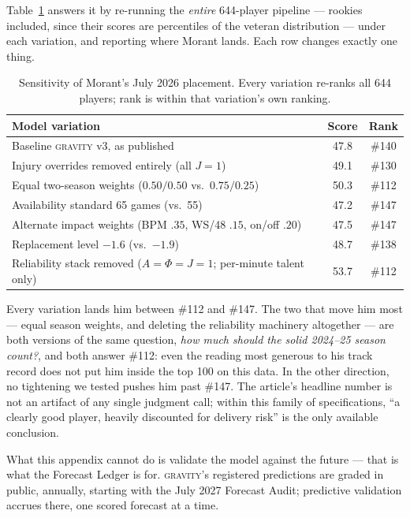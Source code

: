 \documentclass[11pt]{article}
\newcommand{\gravity}{\textsc{gravity}}
\begin{document}
Table~\ref{tab:sens} answers it by re-running the \emph{entire} 644-player pipeline ---
rookies included, since their scores are percentiles of the veteran distribution ---
under each variation, and reporting where Morant lands. Each row changes exactly one
thing.

\begin{table}[h]
\centering\small
\caption{Sensitivity of Morant's July 2026 placement. Every variation re-ranks all 644
players; rank is within that variation's own ranking.}
\begin{tabular}{lcc}
\toprule
Model variation & Score & Rank \\
\midrule
Baseline \gravity{} v3, as published & 47.8 & \#140 \\
Injury overrides removed entirely (all $J{=}1$) & 49.1 & \#130 \\
Equal two-season weights ($0.50/0.50$ vs.\ $0.75/0.25$) & 50.3 & \#112 \\
Availability standard 65 games (vs.\ 55) & 47.2 & \#147 \\
Alternate impact weights (BPM $.35$, WS/48 $.15$, on/off $.20$) & 47.5 & \#147 \\
Replacement level $-1.6$ (vs.\ $-1.9$) & 48.7 & \#138 \\
Reliability stack removed ($A{=}\Phi{=}J{=}1$; per-minute talent only) & 53.7 & \#112 \\
\bottomrule
\end{tabular}
\label{tab:sens}
\end{table}

Every variation lands him between \#112 and \#147. The two that move him most ---
equal season weights, and deleting the reliability machinery altogether --- are both
versions of the same question, \emph{how much should the solid 2024--25 season count?},
and both answer \#112: even the reading most generous to his track record does not put
him inside the top 100 on this data. In the other direction, no tightening we tested
pushes him past \#147. The article's headline number is not an artifact of any single
judgment call; within this family of specifications, ``a clearly good player, heavily
discounted for delivery risk'' is the only available conclusion.

What this appendix cannot do is validate the model against the future --- that is what
the Forecast Ledger is for. \gravity{}'s registered predictions are graded in public,
annually, starting with the July 2027 Forecast Audit; predictive validation accrues
there, one scored forecast at a time.
\end{document}
